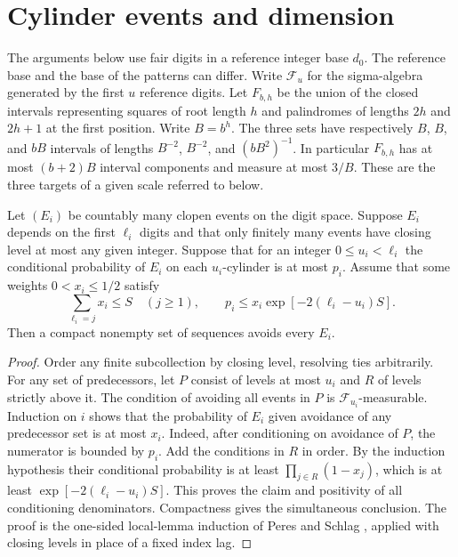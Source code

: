 \section{Cylinder events and dimension}\label{sec:sparse-arithmetic}

The arguments below use fair digits in a reference integer base $d_0$. The reference base and the base of the patterns can differ. Write $\mathcal F_u$ for the sigma-algebra generated by the first $u$ reference digits. Let $F_{b,h}$ be the union of the closed intervals representing squares of root length $h$ and palindromes of lengths $2h$ and $2h+1$ at the first position. Write $B=b^h$. The three sets have respectively $B$, $B$, and $bB$ intervals of lengths $B^{-2}$, $B^{-2}$, and $(bB^2)^{-1}$. In particular $F_{b,h}$ has at most $(b+2)B$ interval components and measure at most $3/B$. These are the three targets of a given scale referred to below.

\begin{lemma}\label{lem:ordered-cylinders}
Let $(E_i)$ be countably many clopen events on the digit space. Suppose $E_i$ depends on the first $\ell_i$ digits and that only finitely many events have closing level at most any given integer. Suppose that for an integer $0\le u_i<\ell_i$ the conditional probability of $E_i$ on each $u_i$-cylinder is at most $p_i$. Assume that some weights $0<x_i\le1/2$ satisfy
\begin{equation}\label{eq:per-level}
 \sum_{\ell_i=j}x_i\le S\quad(j\ge1),
 \qquad p_i\le x_i\exp[-2(\ell_i-u_i)S].
\end{equation}
Then a compact nonempty set of sequences avoids every $E_i$.
\end{lemma}

\begin{proof}
Order any finite subcollection by closing level, resolving ties arbitrarily. For any set of predecessors, let $P$ consist of levels at most $u_i$ and $R$ of levels strictly above it. The condition of avoiding all events in $P$ is $\mathcal F_{u_i}$-measurable. Induction on $i$ shows that the probability of $E_i$ given avoidance of any predecessor set is at most $x_i$. Indeed, after conditioning on avoidance of $P$, the numerator is bounded by $p_i$. Add the conditions in $R$ in order. By the induction hypothesis their conditional probability is at least $\prod_{j\in R}(1-x_j)$, which is at least $\exp[-2(\ell_i-u_i)S]$. This proves the claim and positivity of all conditioning denominators. Compactness gives the simultaneous conclusion. The proof is the one-sided local-lemma induction of Peres and Schlag \cite{PS}, applied with closing levels in place of a fixed index lag.
\end{proof}

